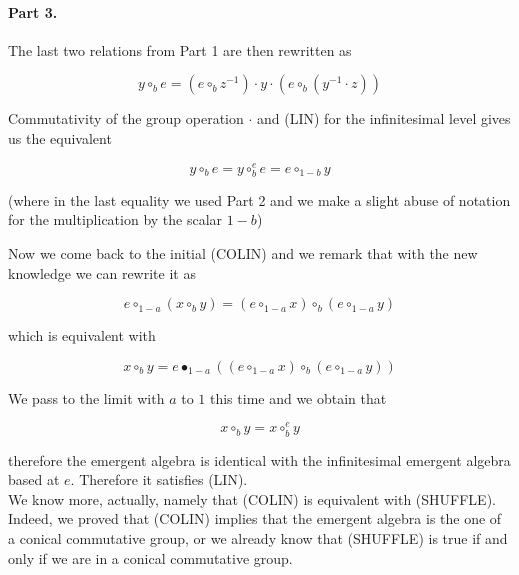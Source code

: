 \documentclass{article}
\begin{document}
\paragraph{Part 3. }The last two relations from Part 1 are then rewritten as 



$$ y \circ_{b} e = (e \circ_{b} z^{-1})  \cdot y \cdot (e \circ_{b} (y^{-1}  \cdot z))$$



Commutativity of the group operation $\cdot$ and (LIN) for the infinitesimal level gives us the equivalent 



$$ y \circ_{b} e = y \circ_{b}^{e} e = e \circ_{1-b} y$$



(where in the last equality we used Part 2 and we make a slight abuse of notation for the multiplication by the scalar $1-b$)



Now we come back to the initial (COLIN) and we remark that with the new knowledge we can rewrite it as 



$$ e \circ_{1-a} (x \circ_{b} y) = (e \circ_{1-a} x ) \circ_{b} ( e \circ_{1-a} y)$$



which is equivalent with 



$$ x \circ_{b} y = e \bullet_{1-a} ((e \circ_{1-a} x ) \circ_{b} ( e \circ_{1-a} y))$$



We pass to the limit with $a$ to $1$ this time and we obtain that 



$$ x \circ_{b} y = x \circ_{b}^{e} y$$



therefore the emergent algebra is identical with the infinitesimal emergent algebra based at $e$. Therefore it satisfies (LIN). \\







We know more, actually, namely that (COLIN) is equivalent with (SHUFFLE). Indeed, we proved that (COLIN) implies that the emergent algebra is the one of a conical commutative group, or we already know that (SHUFFLE) is true if and only if we are in a conical commutative group. 
\end{document}

